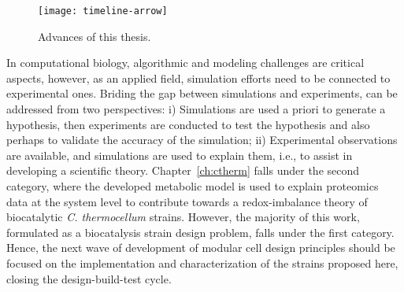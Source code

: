 \begin{figure}[h]
  \centering
  \texttt{[image: timeline-arrow]}
    \caption{Advances of this thesis.}
    \label{fig8:arrow}
\end{figure}



In computational biology, algorithmic and modeling challenges are critical aspects, however, as an applied field, simulation efforts need to be connected to experimental ones.
Briding the gap between simulations and experiments, can be addressed from two perspectives:
i) Simulations are used a priori to generate a hypothesis, then experiments are conducted to test the hypothesis and also perhaps to validate the accuracy of the simulation;
ii) Experimental observations are available, and simulations are used to explain them, i.e., to assist in developing a scientific theory.
Chapter~\ref{ch:ctherm} falls under the second category, where the developed metabolic model is used to explain proteomics data at the system level to contribute towards a redox-imbalance theory of biocatalytic \textit{C. thermocellum} strains. %
However, the majority of this work, formulated as a biocatalysis strain design problem, falls under the first category.
Hence, the next wave of development of modular cell design principles should be focused on the implementation and characterization of the strains proposed here, closing the design-build-test cycle.




